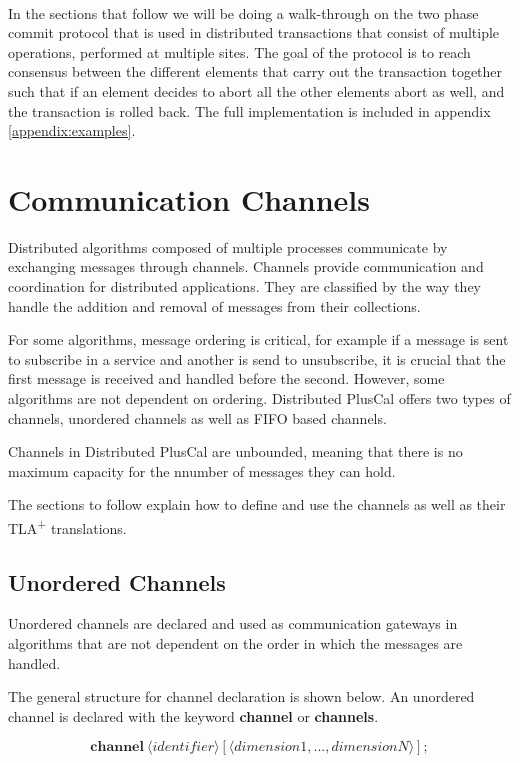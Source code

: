 \documentclass{thesul}
\newcommand{\tlaplus}{TLA\textsuperscript{+}\xspace}
\newcommand{\keyword}[1]{\textbf{#1}}
\newcommand{\entity}[1]{\ensuremath{\langle}#1\ensuremath{\rangle}}
\begin{document}
\hfill\\
In the sections that follow we will be doing a walk-through on the two phase commit protocol that is used in distributed transactions that consist of multiple operations, performed at multiple sites. The goal of the protocol is to reach consensus between the different elements that carry out the transaction together such that if an element decides to abort all the other elements abort as well, and the transaction is rolled back. The full implementation is included in appendix \ref{appendix:examples}.

\FloatBarrier
\section{Communication Channels}
\label{comChannels}

Distributed algorithms composed of multiple processes communicate by exchanging messages through channels. Channels provide communication and coordination for distributed applications. They are classified by the way they handle the addition and removal of messages from their collections. 

For some algorithms, message ordering is critical, for example if a message is sent to subscribe in a service and another is send to unsubscribe, it is crucial that the first message is received and handled before the second. However, some algorithms are not dependent on ordering. Distributed PlusCal offers two types of channels, unordered channels as well as FIFO based channels.

Channels in Distributed PlusCal are unbounded, meaning that there is no maximum capacity for the nnumber of messages they can hold.

The sections to follow explain how to define and use the channels as well as their \tlaplus translations. 

\subsection{Unordered Channels}

Unordered channels are declared and used as communication gateways in algorithms that are not dependent on the order in which the messages are handled.

The general structure for channel declaration is shown below. An unordered channel is declared with the keyword \keyword{channel} or \keyword{channels}. 

\[
 \keyword{channel}\ \entity{identifier}[\entity{dimension1,...,dimensionN}];
\]
\end{document}
